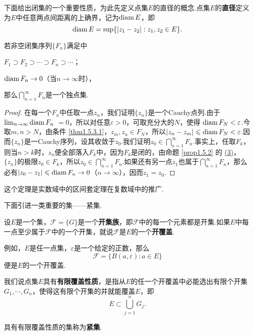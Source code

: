 下面给出闭集的一个重要性质，为此先定义点集$E$的直径的概念.点集$E$的\textbf{直径}定义为$E$中任意两点间距离的上确界，记为$\operatorname{diam} E$，即
\[
  \operatorname{diam} E = \sup\{ |z_1 - z_2|: z_1,z_2\in E \}.
\]

\begin{theorem}\label{thm1.5.3}
  若非空闭集序列$\{F_n\}$满足中
  \begin{eenum}
    \item \label{thm1.5.3.1} $F_1\supset F_2\supset\cdots\supset F_n\supset\cdots$；
    \item \label{thm1.5.3.2} $\operatorname{diam} F_n\to 0$（当$n\to\infty$时），
  \end{eenum}
  那么$\bigcap_{n=1}^\infty F_n$是一个独点集.
\end{theorem}
\begin{proof}
  在每一个$F_n$中任取一点$z_n$，我们证明$\{z_n\}$是一个Cauchy点列.由于$\lim_{n\to\infty}\operatorname{diam} F_n$ $=0$，所以对任意$\varepsilon>0$，可取充分大的$N$，使得 $\operatorname{diam} F_N<\varepsilon$.今取$m,n>N$，由条件 \ref{thm1.5.3.1}，$z_m,z_n\in F_N$，所以$|z_n-z_m|\leqslant\operatorname{diam} F_N<\varepsilon$.因而$\{z_n\}$是一Cauchy序列，设其收敛于$z_0$.我们证明$z_0\in\bigcap_{n=1}^\infty F_n$.事实上，任取$F_k$，则当$n>k$时，$z_n$便全部落入$F_k$中，因为$F_k$是闭的，由命题 \ref{prop1.5.2} 的 \hyperlink{prop1.5.2.3}{(3)}，$\{z_n\}$的极限$z_0\in F_k$，所以$z_0\in\bigcap_{n=1}^\infty F_n$.如果还有另一点$z_1$也属于$\bigcap_{n=1}^\infty F_n$，那么必有$|z_0-z_1|\leqslant\operatorname{diam} F_n\to0$（$n\to\infty$），因而$z_1=z_0$.
\end{proof}

这个定理是实数域中的区间套定理在复数域中的推广.

下面引进一类重要的集——紧集.

设$E$是一个集，$\mathscr F=\{G\}$是一个\textbf{开集族}，即$\mathscr F$中的每一个元素都是开集.如果$E$中每一点至少属于$\mathscr F$中的一个开集，就说$\mathscr F$是$E$的一个\textbf{开覆盖}.

例如，$E$是任一点集，$\varepsilon$是一个给定的正数，那么
\[
  \mathscr F = \{ B(a,\varepsilon):a\in E \}
\]
便是$E$的一个开覆盖.

我们说点集$E$具有\textbf{有限覆盖性质}，是指从$E$的任一个开覆盖中必能选出有限个开集$G_1,\cdots,G_n$，使得这有限个开集的并就能覆盖$E$，即
\[
  E \subset \bigcup_{j=1}^n G_j.
\]
\begin{definition}\label{def1.5.4}
  具有有限覆盖性质的集称为\textbf{紧集}.
\end{definition}

